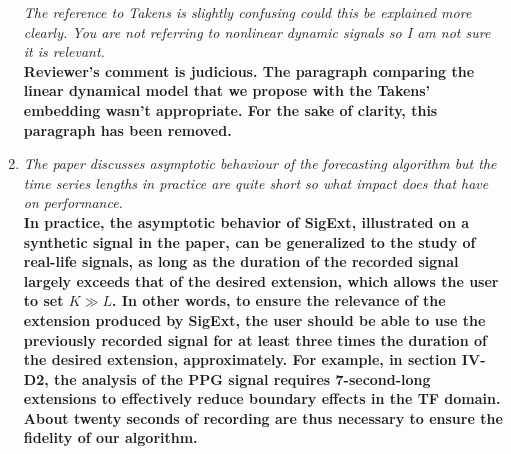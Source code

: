 \documentclass[11pt,DIV=16]{scrartcl}
\begin{document}
\begin{enumerate}[1)]
\textit{The reference to Takens is slightly confusing could this be explained more clearly. You are not referring to nonlinear dynamic signals so I am not sure it is relevant.} \\
\textbf{Reviewer's comment is judicious. The paragraph comparing the linear dynamical model that we propose with the Takens' embedding wasn't appropriate. For the sake of clarity, this paragraph has been removed.}
\item
\textit{The paper discusses asymptotic behaviour of the forecasting algorithm but the time series lengths in practice are quite short so what impact does that have on performance.} \\
\textbf{In practice, the asymptotic behavior of \textsf{SigExt}, illustrated on a synthetic signal in the paper, can be generalized to the study of real-life signals, as long as the duration of the recorded signal largely exceeds that of the desired extension, which allows the user to set $K \gg L$. In other words, to ensure the relevance of the extension produced by \textsf{SigExt}, the user should be able to use the previously recorded signal for at least three times the duration of the desired extension, approximately. For example, in section IV-D2, the analysis of the PPG signal requires 7-second-long extensions to effectively reduce boundary effects in the TF domain. About twenty seconds of recording are thus necessary to ensure the fidelity of our algorithm.}
\end{enumerate}
\end{document}
